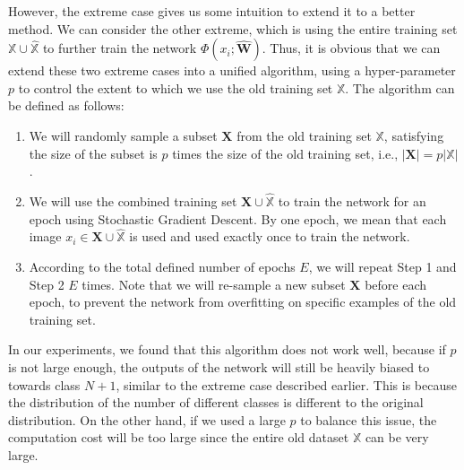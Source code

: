 However, the extreme case gives us some intuition to extend it to a better method. We can consider the other extreme, which is using the entire training set $\mathbb{X}\cup \hat{\mathbb{X}}$ to further train the network $\Phi(x_i; \hat{\mathbf{W}})$. Thus, it is obvious that we can extend these two extreme cases into a unified algorithm, using a hyper-parameter $p$ to control the extent to which we use the old training set $\mathbb{X}$. The algorithm can be defined as follows:

\begin{enumerate}
	\item We will randomly sample a subset $\mathbf{X}$ from the old training set $\mathbb{X}$, satisfying the size of the subset is $p$ times the size of the old training set, i.e., $|\mathbf{X}| = p|\mathbb{X}|$.
	\item We will use the combined training set $\mathbf{X} \cup \hat{\mathbb{X}}$ to train the network for an epoch using Stochastic Gradient Descent. By one epoch, we mean that each image $x_i \in \mathbf{X} \cup \hat{\mathbb{X}}$ is used and used exactly once to train the network.
	\item According to the total defined number of epochs $E$, we will repeat Step 1 and Step 2 $E$ times. Note that we will re-sample a new subset $\mathbf{X}$ before each epoch, to prevent the network from overfitting on specific examples of the old training set.
\end{enumerate}

In our experiments, we found that this algorithm does not work well, because if $p$ is not large enough, the outputs of the network will still be heavily biased to towards class $N+1$, similar to the extreme case described earlier. This is because the distribution of the number of different classes is different to the original distribution. On the other hand, if we used a large $p$ to balance this issue, the computation cost will be too large since the entire old dataset $\mathbb{X}$ can be very large.

